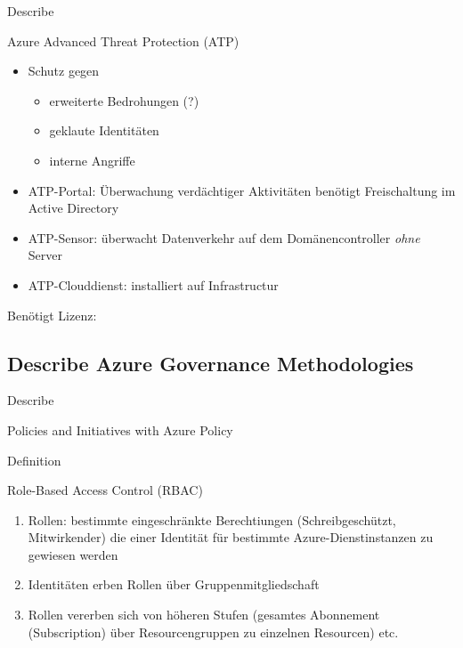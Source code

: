 \documentclass{scrartcl}
\newenvironment{flashcard}[2][]{%
    #1
    \vfill
    \centerline{\Large{#2}}
    \vfill
\newpage
}
{\newpage}
\newcommand{\subsectioncard}[1]{
    \vspace*{\stretch{1}}
    \subsection{#1}
    \vspace*{\stretch{1}}
    \pagebreak
}
\begin{document}
    \begin{flashcard}[Describe]{Azure Advanced Threat Protection (ATP)}
        \begin{itemize}
            \item Schutz gegen 
            \begin{itemize}
                \item erweiterte Bedrohungen (?)
                \item geklaute Identitäten
                \item interne Angriffe
            \end{itemize}
            \item ATP-Portal: Überwachung verdächtiger Aktivitäten\newline
                benötigt Freischaltung im Active Directory
            \item ATP-Sensor: überwacht Datenverkehr auf dem Domänencontroller \emph{ohne} Server
            \item ATP-Clouddienst: installiert auf Infrastructur
        \end{itemize}
        Benötigt Lizenz:
    \end{flashcard}

    \subsectioncard{Describe Azure Governance Methodologies}

    \begin{flashcard}[Describe]{Policies and Initiatives with Azure Policy}

    \end{flashcard}

    \begin{flashcard}[Definition]{Role-Based Access Control (RBAC)}
        \begin{enumerate}
            \item Rollen: bestimmte eingeschränkte Berechtiungen (Schreibgeschützt, Mitwirkender) die einer Identität für bestimmte Azure-Dienstinstanzen zu gewiesen werden
            \item Identitäten erben Rollen über Gruppenmitgliedschaft
            \item Rollen vererben sich von höheren Stufen (gesamtes Abonnement (Subscription) über Resourcengruppen zu einzelnen Resourcen) etc.
        \end{enumerate}
    \end{flashcard}
\end{document}
